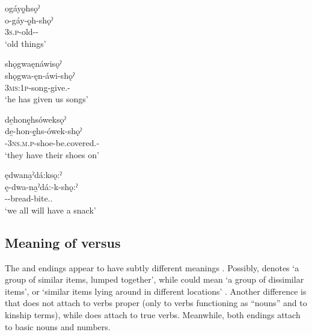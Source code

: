 
\ex ogáyǫ̱hsǫˀ\\
\gll o-gáy-ǫ̱h-shǫˀ\\
 \textsc{3s.p}-old-{\stat}-{\pluralizer}\\
\glt `old things'


\ex shǫgwaęnáwisǫˀ\\
\gll shǫgwa-ęn-áwi-shǫˀ\\
 \textsc{3ms:1p}-song-give.{\stat}-{\pluralizer}\\
\glt `he has given us songs'


\ex de̱honę̱hsóweksǫˀ\\
\gll de̱-hon-ę̱hs-ówek-shǫˀ\\
 {\dualic}-\textsc{3ns.m.p}-shoe-be.covered.{\stat}-{\pluralizer}\\
\glt `they have their shoes on'

\ex ędwana̱ˀdá:ksǫ:ˀ\\
\gll ę-dwa-na̱ˀdá:-k-shǫ:ˀ\\
 \fut--bread-bite.{\punctual}.{\pluralizer}\footnotemark{}\\
\glt `we all will have a snack'
\z
\z


\subsection{Meaning of  {\pluralizer} versus  {\pluralizer}} \label{Meaning of -sǫˀ versus -sǫ:ˀǫh}
The  {\pluralizer} and  {\pluralizer} endings appear to have subtly different meanings . Possibly,  {\pluralizer} denotes ‘a group of similar items, lumped together’, while  {\pluralizer} could mean ‘a group of dissimilar items’, or ‘similar items lying around in different locations’ . Another difference is that  {\pluralizer} does not attach to verbs proper (only to verbs functioning as “nouns” and to kinship terms), while  {\pluralizer} does attach to true verbs. Meanwhile, both endings attach to basic nouns and numbers.
 
